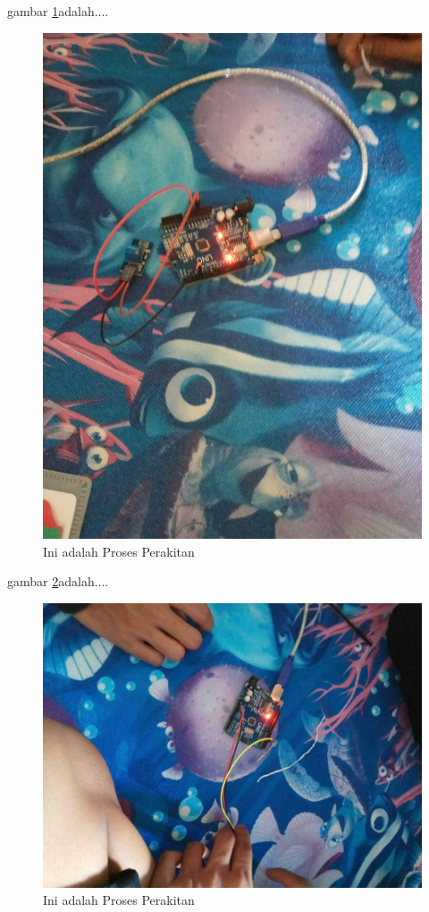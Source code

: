   gambar \ref{ar5}adalah....
  \begin{figure}[ht]
  \centerline{\includegraphics[width=.75\textwidth]{figures/ar5.jpg}}
  \caption{Ini adalah Proses Perakitan}
  \label{ar5}
  \end{figure}

 gambar \ref{ar6}adalah....
  \begin{figure}[ht]
  \centerline{\includegraphics[width=.75\textwidth]{figures/ar6.jpg}}
  \caption{Ini adalah Proses Perakitan}
  \label{ar6}
  \end{figure}

